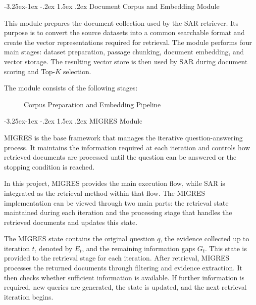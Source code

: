 \documentclass[12pt,a4paper]{report}
\makeatletter
\renewcommand\subsection{\@startsection{subsection}{2}{\z@}%
    {-3.25ex\@plus -1ex \@minus -.2ex}%
    {1.5ex \@plus .2ex}%
    {\normalfont\fontsize{14}{17}\selectfont\bfseries}}
\makeatother
\begin{document}
\subsection{Document Corpus and Embedding Module}

This module prepares the document collection used by the SAR retriever. Its purpose is to convert the source datasets into a common searchable format and create the vector representations required for retrieval. The module performs four main stages: dataset preparation, passage chunking, document embedding, and vector storage. The resulting vector store is then used by SAR during document scoring and Top-$K$ selection.

The module consists of the following stages:

\begin{figure}[H]
\centering
{}
\caption{Corpus Preparation and Embedding Pipeline}
\label{fig:impl-corpus-flow}
\end{figure}

\subsection{MIGRES Module}

MIGRES is the base framework that manages the iterative question-answering process. It maintains the information required at each iteration and controls how retrieved documents are processed until the question can be answered or the stopping condition is reached.

In this project, MIGRES provides the main execution flow, while SAR is integrated as the retrieval method within that flow. The MIGRES implementation can be viewed through two main parts: the retrieval state maintained during each iteration and the processing stage that handles the retrieved documents and updates this state.

The MIGRES state contains the original question $q$, the evidence collected up to iteration $t$, denoted by $E_t$, and the remaining information gaps $G_t$. This state is provided to the retrieval stage for each iteration. After retrieval, MIGRES processes the returned documents through filtering and evidence extraction. It then checks whether sufficient information is available. If further information is required, new queries are generated, the state is updated, and the next retrieval iteration begins.
\end{document}
